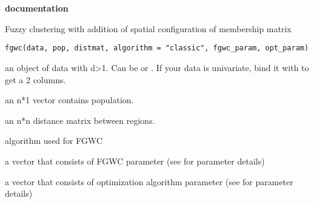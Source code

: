 \documentclass[a4paper]{book}
\begin{document}
\chapter*{}
\begin{center}
{\textbf{\huge \R{} documentation}} \par{}
\par\bigskip{\large \today}
\end{center}
%
\begin{Description}\relax
Fuzzy clustering with addition of spatial configuration of membership matrix
\end{Description}
%
\begin{Usage}
\begin{verbatim}
fgwc(data, pop, distmat, algorithm = "classic", fgwc_param, opt_param)
\end{verbatim}
\end{Usage}
%
\begin{Arguments}
\begin{ldescription}
\item[\code{data}] an object of data with d>1. Can be  or . If your data is univariate, bind it with  to get a 2 columns.

\item[\code{pop}] an n*1 vector contains population.

\item[\code{distmat}] an n*n distance matrix between regions.

\item[\code{algorithm}] algorithm used for FGWC

\item[\code{fgwc\_param}] a vector that consists of FGWC parameter (see  for parameter details)

\item[\code{opt\_param}] a vector that consists of optimization algorithm parameter (see  for parameter details)
\end{ldescription}
\end{Arguments}
%
\end{document}

